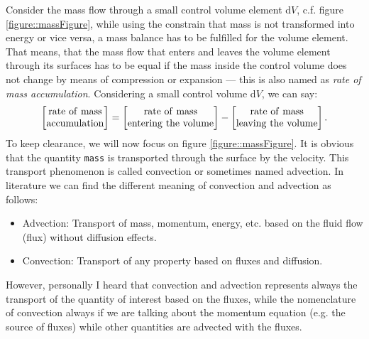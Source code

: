 \documentclass[MathematicsNumericsDerivationsAndOpenFOAM.tex]{subfiles}
\begin{document}
	Consider the mass flow through a small control volume element d$V$, c.f.
    figure \ref{figure::massFigure}, while using the constrain that mass is
    not transformed into energy or vice versa, a mass balance has to be
    fulfilled for the volume element. That means, that the mass flow that enters
    and leaves the volume element through its surfaces has to be equal if the
    mass inside the control volume does not change by means of compression or
    expansion --- this is also named as \textit{rate of mass accumulation}.
    Considering a small control volume d$V$, we can say:
%
%
\begin{equation}
\left[
 \begin{matrix}
  \mathrm{rate~of~mass}\\
  \mathrm{accumulation}
 \end{matrix}
\right]
=
\left[
 \begin{matrix}
  \mathrm{rate~of~mass}\\
  \mathrm{entering~the~volume}
 \end{matrix}
\right]
-
\left[
 \begin{matrix}
  \mathrm{rate~of~mass}\\
  \mathrm{leaving~the~volume}
 \end{matrix}
\right].
\label{equation::massWord}
\end{equation}
%
%
	To keep clearance, we will now focus on figure \ref{figure::massFigure}.
    It is obvious that the quantity \texttt{mass} is transported through the
    surface by the velocity. This transport phenomenon is called convection or
    sometimes named advection. In literature we can find the different meaning
    of convection and advection as follows:
%
%
\begin{itemize}
 \item Advection: Transport of mass, momentum, energy, etc. based on the fluid
       flow (flux) without diffusion effects.
 \item Convection: Transport of any property based on fluxes and diffusion.
\end{itemize}
%
%
    However, personally I heard that convection and advection represents
    always the transport of the quantity of interest based on the fluxes,
    while the nomenclature of convection always if we are talking about the
    momentum equation (e.g. the source of fluxes) while other quantities are
    advected with the fluxes.
\end{document}
